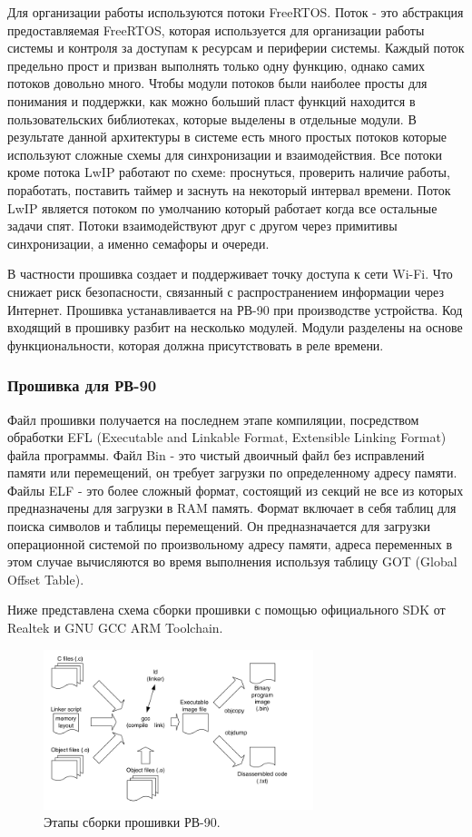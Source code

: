 Для организации работы используются потоки FreeRTOS. Поток - это абстракция предоставляемая FreeRTOS, которая используется для организации работы системы и контроля за доступам к ресурсам и периферии системы. Каждый поток предельно прост и призван выполнять только одну функцию, однако самих потоков довольно много. Чтобы модули потоков были наиболее просты для понимания и поддержки, как можно больший пласт функций находится в пользовательских библиотеках, которые выделены в отдельные модули. В результате данной архитектуры в системе есть много простых потоков которые используют сложные схемы для синхронизации и взаимодействия. Все потоки кроме потока LwIP работают по схеме: проснуться, проверить наличие работы, поработать, поставить таймер и заснуть на некоторый интервал времени. Поток LwIP является потоком по умолчанию который работает когда все остальные задачи спят. Потоки взаимодействуют друг с другом через примитивы синхронизации, а именно семафоры и очереди.

В частности прошивка создает и поддерживает точку доступа к сети Wi-Fi. Что снижает риск безопасности, связанный с распространением информации через Интернет. 
Прошивка устанавливается на РВ-90 при производстве устройства. Код входящий в прошивку разбит на несколько модулей. Модули разделены на основе функциональности, которая должна присутствовать в реле времени.


\subsubsection{ Прошивка для РВ-90 }
Файл прошивки получается на последнем этапе компиляции, посредством обработки EFL (Executable and Linkable Format, Extensible Linking Format) файла программы. 
Файл Bin - это чистый двоичный файл без исправлений памяти или перемещений, он требует загрузки по определенному адресу памяти.
Файлы ELF - это более сложный формат, состоящий из секций не все из которых предназначены для загрузки в RAM память. Формат включает в себя таблиц для поиска символов и таблицы перемещений. Он предназначается для загрузки операционной системой по произвольному адресу памяти, адреса переменных в этом случае вычисляются во время выполнения используя таблицу GOT (Global Offset Table). 

Ниже представлена схема сборки прошивки с помощью официального SDK от Realtek и GNU GCC ARM Toolchain.
 
\begin{figure}[h!]
    \centering
    \includegraphics[width=0.7\textwidth]{compilation_steps_firmware.png}
    \caption{Этапы сборки прошивки РВ-90.}
\end{figure}

